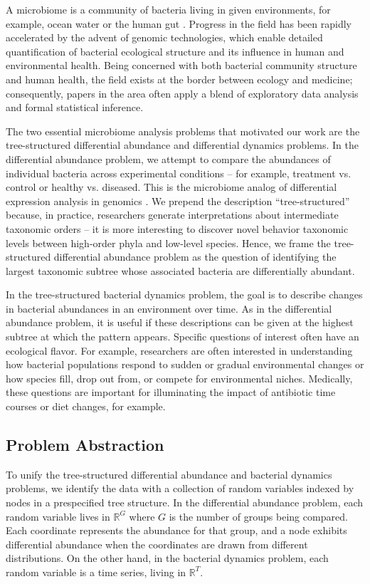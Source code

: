 \documentclass[12pt]{article}
\begin{document}
A microbiome is a community of bacteria living in given environments,
for example, ocean water or the human gut
\citep{human2012structure, cho2012human}. Progress in the field has
been rapidly accelerated by the advent of genomic technologies, which
enable detailed quantification of bacterial ecological structure and its
influence in human and environmental health. Being concerned with both
bacterial community structure and human health, the field exists at the
border between ecology and medicine; consequently, papers in the area
often apply a blend of exploratory data analysis and formal statistical
inference.

The two essential microbiome analysis problems that motivated our work
are the tree-structured differential abundance and differential dynamics
problems. In the differential abundance problem, we attempt to compare
the abundances of individual bacteria across experimental conditions --
for example, treatment vs. control or healthy vs. diseased. This is the
microbiome analog of differential expression analysis in genomics
\citep{anders2010differential}.
We prepend the description ``tree-structured'' because, in practice,
researchers generate interpretations about intermediate taxonomic orders
-- it is more interesting to discover novel behavior taxonomic levels
between high-order phyla and low-level species. Hence, we frame the
tree-structured differential abundance problem as the question of
identifying the largest taxonomic subtree whose associated bacteria are
differentially abundant.

In the tree-structured bacterial dynamics problem, the goal is to
describe changes in bacterial abundances in an environment over time. As
in the differential abundance problem, it is useful if these
descriptions can be given at the highest subtree at which the pattern
appears. Specific questions of interest often have an ecological flavor.
For example, researchers are often interested in understanding how
bacterial populations respond to sudden or gradual environmental changes
or how species fill, drop out from, or compete for environmental niches.
Medically, these questions are important for illuminating the impact of
antibiotic time courses or diet changes, for example.

\subsection{Problem Abstraction}\label{problem-abstraction}

To unify the tree-structured differential abundance and bacterial dynamics
problems, we identify the data with a collection of random variables indexed by
nodes in a prespecified tree structure. In the differential abundance problem,
each random variable lives in \(\mathbb{R}^{G}\) where \(G\) is the number of
groups being compared. Each coordinate represents the abundance for that group,
and a node exhibits differential abundance when the coordinates are drawn from
different distributions. On the other hand, in the bacterial dynamics problem,
each random variable is a time series, living in \(\mathbb{R}^{T}\).
\end{document}
